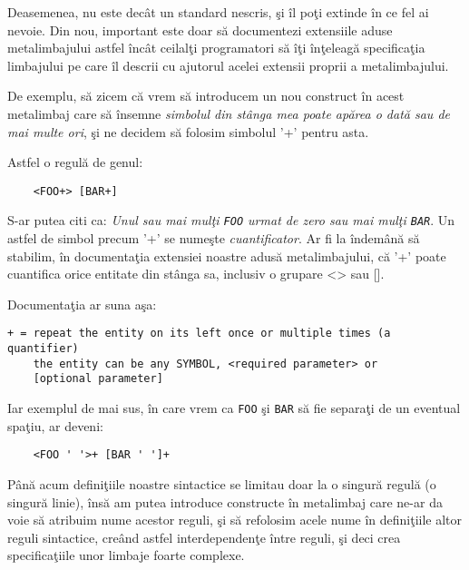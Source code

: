 Deasemenea, nu este decât un standard nescris, şi îl poţi
extinde în ce fel ai nevoie. Din nou, important este doar
să documentezi {\glqq}extensiile{\grqq} aduse metalimbajului astfel
încât ceilalţi programatori să îţi înţeleagă specificaţia
limbajului pe care îl descrii cu ajutorul acelei
extensii proprii a metalimbajului.

De exemplu, să zicem că vrem să introducem un nou
construct în acest metalimbaj care să însemne \textit{simbolul
din stânga mea poate apărea o dată sau de mai multe ori}, şi
ne decidem să folosim simbolul '+' pentru asta.

Astfel o regulă de genul:
\begin{verbatim}
	<FOO+> [BAR+]
\end{verbatim}
S-ar putea citi ca: \textit{Unul sau mai mulţi \texttt{FOO} urmat de zero sau mai
mulţi \texttt{BAR}}. Un astfel de simbol precum '+' se numeşte \textsl{cuantificator}.
Ar fi la îndemână să stabilim, în documentaţia extensiei noastre adusă metalimbajului,
că '+' poate cuantifica orice entitate din stânga sa, inclusiv o grupare <> sau [].

Documentaţia ar suna aşa:
\begin{verbatim}
+ = repeat the entity on its left once or multiple times (a quantifier)
    the entity can be any SYMBOL, <required parameter> or
	[optional parameter]
\end{verbatim}
Iar exemplul de mai sus, în care vrem ca \texttt{FOO} şi \texttt{BAR}
să fie separaţi de un eventual spaţiu, ar deveni:
\begin{verbatim}
	<FOO ' '>+ [BAR ' ']+
\end{verbatim}

Până acum definiţiile noastre sintactice se limitau doar la
o singură regulă (o singură linie), însă am putea introduce
constructe în metalimbaj care ne-ar da voie să atribuim nume
acestor reguli, şi să refolosim acele nume în definiţiile altor
reguli sintactice, creând astfel interdependenţe între reguli,
şi deci crea specificaţiile unor limbaje foarte complexe.


